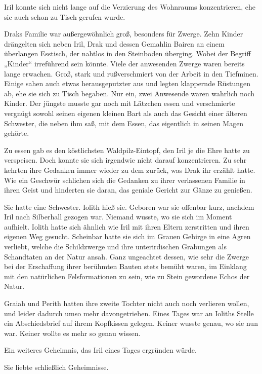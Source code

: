 Iril konnte sich nicht lange auf die Verzierung des Wohnraums konzentrieren, ehe sie auch schon zu Tisch gerufen wurde.

Draks Familie war außergewöhnlich groß, besonders für Zwerge. Zehn Kinder drängelten sich neben Iril, Drak und dessen Gemahlin Bairen an einem überlangen Esstisch, der nahtlos in den Steinboden überging. Wobei der Begriff „Kinder“ irreführend sein könnte. Viele der anwesenden Zwerge waren bereits lange erwachen. Groß, stark und rußverschmiert von der Arbeit in den Tiefminen. Einige sahen auch etwas herausgeputzter aus und legten klappernde Rüstungen ab, ehe sie sich zu Tisch begaben. Nur ein, zwei Anwesende waren wahrlich noch Kinder. Der jüngste musste gar noch mit Lätzchen essen und verschmierte vergnügt sowohl seinen eigenen kleinen Bart als auch das Gesicht einer älteren Schwester, die neben ihm saß, mit dem Essen, das eigentlich in seinen Magen gehörte.

Zu essen gab es den köstlichsten Waldpilz-Eintopf, den Iril je die Ehre hatte zu verspeisen. Doch konnte sie sich irgendwie nicht darauf konzentrieren. Zu sehr kehrten ihre Gedanken immer wieder zu dem zurück, was Drak ihr erzählt hatte. Wie ein Geschwür schlichen sich die Gedanken zu ihrer verlassenen Familie in ihren Geist und hinderten sie daran, das geniale Gericht zur Gänze zu genießen.

Sie hatte eine Schwester. Iolith hieß sie. Geboren war sie offenbar kurz, nachdem Iril nach Silberhall gezogen war. Niemand wusste, wo sie sich im Moment aufhielt. Iolith hatte sich ähnlich wie Iril mit ihren Eltern zerstritten und ihren eigenen Weg gesucht. Scheinbar hatte sie sich im Grauen Gebirge in eine Agren verliebt, welche die Schildzwerge und ihre unterirdischen Grabungen als Schandtaten an der Natur ansah. Ganz ungeachtet dessen, wie sehr die Zwerge bei der Erschaffung ihrer berühmten Bauten stets bemüht waren, im Einklang mit den natürlichen Felsformationen zu sein, wie zu Stein gewordene Echos der Natur.

Graiah und Perith hatten ihre zweite Tochter nicht auch noch verlieren wollen, und leider dadurch umso mehr davongetrieben. Eines Tages war an Ioliths Stelle ein Abschiedsbrief auf ihrem Kopfkissen gelegen. Keiner wusste genau, wo sie nun war. Keiner wollte es mehr so genau wissen.

Ein weiteres Geheimnis, das Iril eines Tages ergründen würde.

Sie liebte schließlich Geheimnisse.\bigskip







